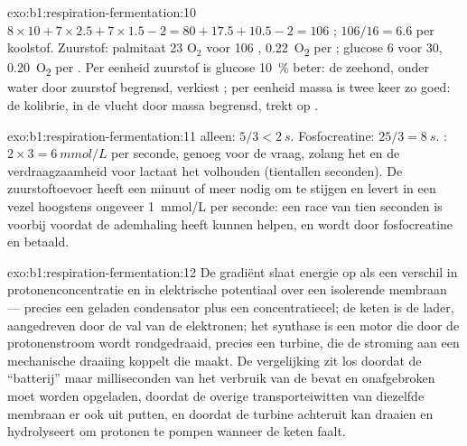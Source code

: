 \begin{solution}{exo:b1:respiration-fermentation:10}
$8\times 10 + 7\times 2.5 + 7\times 1.5 - 2 = 80 + 17.5 + 10.5 - 2 =
106$ ; $106/16 = 6.6$ per koolstof. Zuurstof: palmitaat 23 $\mathrm{O_2}$ voor
106 , \qty{0.22}{O_2} per ; glucose 6 voor 30, \qty{0.20}{O_2} per . Per
eenheid zuurstof is glucose \qty{10}{\%} beter: de zeehond, onder water door
zuurstof begrensd, verkiest ; per eenheid massa is  twee keer zo
goed: de kolibrie, in de vlucht door massa begrensd, trekt op .
\end{solution}

\begin{solution}{exo:b1:respiration-fermentation:11}
 alleen: $5/3 < \qty{2}{s}$. Fosfocreatine: $25/3 = \qty{8}{s}$. :
$2\times 3 = \qty{6}{mmol/L}$  per seconde, genoeg voor de vraag, zolang het
 en de verdraagzaamheid voor lactaat het volhouden (tientallen seconden).
De zuurstoftoevoer heeft een minuut of meer nodig om te stijgen en levert in een
vezel hoogstens ongeveer \qty{1}{mmol/L}  per seconde: een race van tien
seconden is voorbij voordat de ademhaling heeft kunnen helpen, en wordt door
fosfocreatine en  betaald.
\end{solution}

\begin{solution}{exo:b1:respiration-fermentation:12}
De gradiënt slaat energie op als een verschil in protonenconcentratie en in
elektrische potentiaal over een isolerende membraan --- precies een geladen
condensator plus een concentratiecel; de keten is de lader, aangedreven door de val
van de elektronen; het synthase is een motor die door de protonenstroom wordt
rondgedraaid, precies een turbine, die de stroming aan een mechanische draaiing
koppelt die  maakt. De vergelijking zit los doordat de ``batterij'' maar
milliseconden van het verbruik van de  bevat en onafgebroken moet worden
opgeladen, doordat de overige transporteiwitten van diezelfde membraan er ook uit
putten, en doordat de turbine achteruit kan draaien en  hydrolyseert om protonen
te pompen wanneer de keten faalt.
\end{solution}


